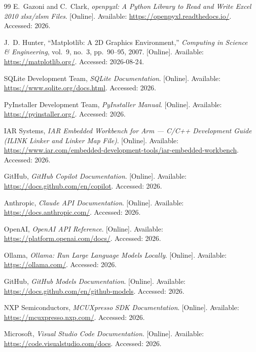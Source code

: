 \documentclass[12pt,a4paper,oneside]{book}
\begin{document}
\begin{thebibliography}{99}
E.~Gazoni and C.~Clark, \emph{openpyxl: A Python Library to Read and Write Excel 2010 xlsx/xlsm Files}. [Online]. Available: \url{https://openpyxl.readthedocs.io/}. Accessed: 2026.

J.~D. Hunter, ``Matplotlib: A 2D Graphics Environment,'' \emph{Computing in Science \& Engineering}, vol.~9, no.~3, pp.~90--95, 2007. [Online]. Available: \url{https://matplotlib.org/}. Accessed: 2026-08-24.

SQLite Development Team, \emph{SQLite Documentation}. [Online]. Available: \url{https://www.sqlite.org/docs.html}. Accessed: 2026.

PyInstaller Development Team, \emph{PyInstaller Manual}. [Online]. Available: \url{https://pyinstaller.org/}. Accessed: 2026.

IAR Systems, \emph{IAR Embedded Workbench for Arm --- C/C++ Development Guide (ILINK Linker and Linker Map File)}. [Online]. Available: \url{https://www.iar.com/embedded-development-tools/iar-embedded-workbench}. Accessed: 2026.

GitHub, \emph{GitHub Copilot Documentation}. [Online]. Available: \url{https://docs.github.com/en/copilot}. Accessed: 2026.

Anthropic, \emph{Claude API Documentation}. [Online]. Available: \url{https://docs.anthropic.com/}. Accessed: 2026.

OpenAI, \emph{OpenAI API Reference}. [Online]. Available: \url{https://platform.openai.com/docs/}. Accessed: 2026.

Ollama, \emph{Ollama: Run Large Language Models Locally}. [Online]. Available: \url{https://ollama.com/}. Accessed: 2026.

GitHub, \emph{GitHub Models Documentation}. [Online]. Available: \url{https://docs.github.com/en/github-models}. Accessed: 2026.

NXP Semiconductors, \emph{MCUXpresso SDK Documentation}. [Online]. Available: \url{https://mcuxpresso.nxp.com/}. Accessed: 2026.


Microsoft, \emph{Visual Studio Code Documentation}. [Online]. Available: \url{https://code.visualstudio.com/docs}. Accessed: 2026.


\end{thebibliography}
\end{document}
